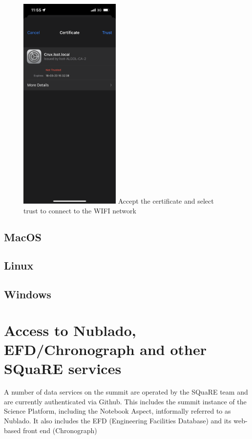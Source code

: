   \begin{figure}
    \centering
    \includegraphics[width=5cm]{Images/ios3.png}
    Accept the certificate and select trust to connect to the WIFI network
  \end{figure}

\newpage
  
  \subsection{MacOS}

  \subsection{Linux}

  \subsection{Windows}

 
  




\newpage
\section{Access to Nublado, EFD/Chronograph and other SQuaRE services}
\label{sec:Nublado}

A number of data services on the summit are operated by the SQuaRE team and are currently authenticated via Github.
This includes the summit instance of the Science Platform, including the Notebook Aspect, intformally referred to as Nublado.
It also includes the EFD (Engineering Facilities Database) and its web-based front end (Chronograph)

